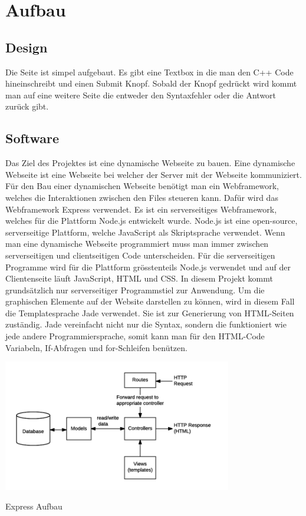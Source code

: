 \documentclass[10pt]{article}
\begin{document}
	\section{Aufbau}
	\subsection{Design}
	Die Seite ist simpel aufgebaut. Es gibt eine Textbox in die man den C++ Code hineinschreibt und einen Submit Knopf. Sobald der Knopf gedrückt wird kommt man auf eine weitere Seite die entweder den Syntaxfehler oder die Antwort zurück gibt.
	\subsection{Software}
	Das Ziel des Projektes ist eine dynamische Webseite zu bauen. Eine dynamische Webseite ist eine Webseite bei welcher der Server mit der Webseite kommuniziert.\cite{dymWeb} %
	Für den Bau einer dynamischen Webseite benötigt man ein Webframework, welches die Interaktionen zwischen den 			Files steueren kann. Dafür wird das Webframework Express verwendet. Es ist ein serverseitiges Webframework, welches für die Plattform Node.js entwickelt wurde.\cite{express} Node.js ist eine open-source, serverseitige Plattform, welche JavaScript als Skriptsprache verwendet.\cite{nodejs}	Wenn man eine dynamische Webseite programmiert muss man immer zwischen serverseitigen und clientseitigen Code unterscheiden. Für die serverseitigen Programme wird für die Plattform grösstenteils Node.js verwendet und auf der Clientenseite läuft JavaScript, HTML und CSS. In diesem Projekt kommt grundsätzlich nur serverseitiger Programmstiel zur Anwendung. Um die graphischen Elemente auf der Website darstellen zu können, wird in diesem Fall die Templatesprache Jade verwendet. Sie ist zur Generierung von HTML-Seiten zuständig. Jade vereinfacht nicht nur die Syntax, sondern die funktioniert wie jede andere Programmiersprache, somit kann man für den HTML-Code Variabeln, If-Abfragen und for-Schleifen benützen. \cite{jade}

\begin{floatingfigure}[r]{11cm}
    \centering
    \includegraphics[width=10cm]{Bilder/MVCexpress.png}
    \caption{Express Aufbau \cite{exprRoutes}}
\end{floatingfigure}
\end{document}
